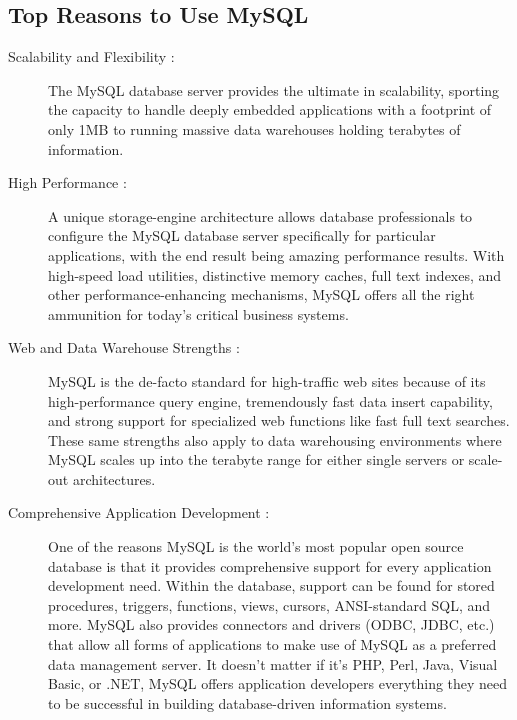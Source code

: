 \subsection{Top Reasons to Use MySQL}

\begin{description}
\item[Scalability and Flexibility :] 
The MySQL database server provides the ultimate in scalability, sporting the capacity to handle deeply embedded applications with a footprint of only 1MB to running massive data warehouses holding terabytes of information.

\item[High Performance :]
A unique storage-engine architecture allows database professionals to configure the MySQL database server specifically for particular applications, with the end result being amazing performance results. With high-speed load utilities, distinctive memory caches, full text indexes, and other performance-enhancing mechanisms, MySQL offers all the right ammunition for today's critical business systems.

\item[Web and Data Warehouse Strengths :]
MySQL is the de-facto standard for high-traffic web sites because of its high-performance query engine, tremendously fast data insert capability, and strong support for specialized web functions like fast full text searches. These same strengths also apply to data warehousing environments where MySQL scales up into the terabyte range for either single servers or scale-out architectures. 

\item[Comprehensive Application Development :]
One of the reasons MySQL is the world's most popular open source database is that it provides comprehensive support for every application development need. Within the database, support can be found for stored procedures, triggers, functions, views, cursors, ANSI-standard SQL, and more. MySQL also provides connectors and drivers (ODBC, JDBC, etc.) that allow all forms of applications to make use of MySQL as a preferred data management server. It doesn't matter if it's PHP, Perl, Java, Visual Basic, or .NET, MySQL offers application developers everything they need to be successful in building database-driven information systems.


\end{description}
